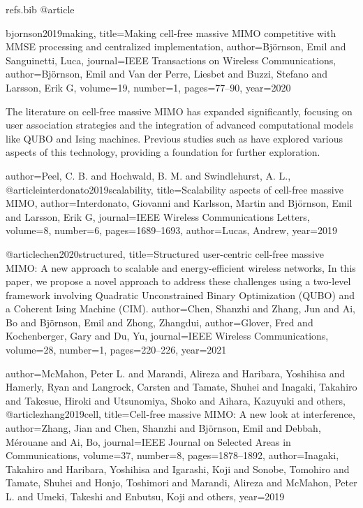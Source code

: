 {\begin{filecontents*}{refs.bib}
@article{bjornson2019making,
  title={Making cell-free massive MIMO competitive with MMSE processing and centralized implementation},
  author={Bj\"ornson, Emil and Sanguinetti, Luca},
  journal={IEEE Transactions on Wireless Communications},
  author={Bj{\"o}rnson, Emil and Van der Perre, Liesbet and Buzzi, Stefano and Larsson, Erik G},
  volume={19},
  number={1},
  pages={77--90},
  year={2020}

The literature on cell-free massive MIMO has expanded significantly, focusing on user association strategies and the integration of advanced computational models like QUBO and Ising machines. Previous studies such as \cite{bashar2019uplink, chen2018channel, zhang2021improving} have explored various aspects of this technology, providing a foundation for further exploration.


}

  author={Peel, C. B. and Hochwald, B. M. and Swindlehurst, A. L.},
@article{interdonato2019scalability,
  title={Scalability aspects of cell-free massive MIMO},
  author={Interdonato, Giovanni and Karlsson, Martin and Bj{\"o}rnson, Emil and Larsson, Erik G},
  journal={IEEE Wireless Communications Letters},
  volume={8},
  number={6},
  pages={1689--1693},
  author={Lucas, Andrew},
  year={2019}
}

@article{chen2020structured,
  title={Structured user-centric cell-free massive MIMO: A new approach to scalable and energy-efficient wireless networks},
In this paper, we propose a novel approach to address these challenges using a two-level framework involving Quadratic Unconstrained Binary Optimization (QUBO) and a Coherent Ising Machine (CIM).
  author={Chen, Shanzhi and Zhang, Jun and Ai, Bo and Bj{\"o}rnson, Emil and Zhong, Zhangdui},
  author={Glover, Fred and Kochenberger, Gary and Du, Yu},
  journal={IEEE Wireless Communications},
  volume={28},
  number={1},
  pages={220--226},
  year={2021}
}

  author={McMahon, Peter L. and Marandi, Alireza and Haribara, Yoshihisa and Hamerly, Ryan and Langrock, Carsten and Tamate, Shuhei and Inagaki, Takahiro and Takesue, Hiroki and Utsunomiya, Shoko and Aihara, Kazuyuki and others},
@article{zhang2019cell,
  title={Cell-free massive MIMO: A new look at interference},
  author={Zhang, Jian and Chen, Shanzhi and Bj{\"o}rnson, Emil and Debbah, M{\'e}rouane and Ai, Bo},
  journal={IEEE Journal on Selected Areas in Communications},
  volume={37},
  number={8},
  pages={1878--1892},
  author={Inagaki, Takahiro and Haribara, Yoshihisa and Igarashi, Koji and Sonobe, Tomohiro and Tamate, Shuhei and Honjo, Toshimori and Marandi, Alireza and McMahon, Peter L. and Umeki, Takeshi and Enbutsu, Koji and others},
  year={2019}
}


\end{filecontents*}}
